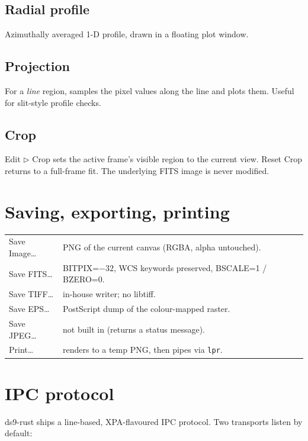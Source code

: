 \documentclass[11pt,a4paper]{article}
\begin{document}
\subsection{Radial profile}
Azimuthally averaged 1-D profile, drawn in a floating plot window.

\subsection{Projection}
For a \emph{line} region, samples the pixel values along the line and
plots them. Useful for slit-style profile checks.

\subsection{Crop}
\textsf{Edit $\triangleright$ Crop} sets the active frame's visible region
to the current view. \textsf{Reset Crop} returns to a full-frame fit. The
underlying FITS image is never modified.

\section{Saving, exporting, printing}

\begin{tabular}{@{}>{\sffamily}lp{}@{}}
\toprule
Save Image\dots & PNG of the current canvas (RGBA, alpha untouched). \\
Save FITS\dots  & BITPIX=$-32$, WCS keywords preserved, BSCALE=1 / BZERO=0. \\
Save TIFF\dots  & in-house writer; no libtiff. \\
Save EPS\dots   & PostScript dump of the colour-mapped raster. \\
Save JPEG\dots  & not built in (returns a status message). \\
Print\dots      & renders to a temp PNG, then pipes via \texttt{lpr}. \\
\bottomrule
\end{tabular}

\section{IPC protocol}\label{sec:ipc}

ds9-rust ships a line-based, XPA-flavoured IPC protocol. Two transports
listen by default:
\end{document}
